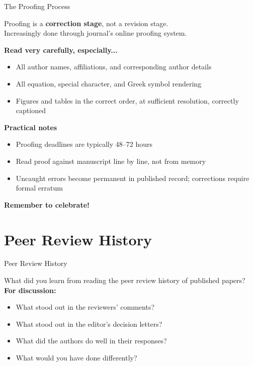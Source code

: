 \documentclass{beamer}
\begin{document}
\begin{frame}{The Proofing Process}

  \footnotesize
  \medskip
  Proofing is a \textbf{correction stage}, not a revision stage.\\
  Increasingly done through journal's online proofing system.

  \medskip
  \textbf{Read very carefully, especially...}
  \begin{itemize}
    \item All author names, affiliations, and corresponding
      author details
    \item All equation, special character, and Greek symbol
      rendering
    \item Figures and tables in the correct order, at
      sufficient resolution, correctly captioned
  \end{itemize}

  \medskip
  \textbf{Practical notes}
  \begin{itemize}
    \item Proofing deadlines are typically 48--72 hours
    \item Read proof against manuscript line by line, not from memory
    \item Uncaught errors become permanent in published record; corrections require formal erratum
  \end{itemize}

  \begin{center}
  {\large \alert{\textbf{Remember to celebrate!}} }
  \end{center}

\end{frame}


\section{Peer Review History}

\begin{frame}{Peer Review History}

  
  What did you learn from reading the peer review history of published papers?\\

  \medskip
  \textbf{For discussion:}
  \begin{itemize}
    \item What stood out in the reviewers' comments?
    \item What stood out in the editor's decision letters?
    \item What did the authors do well in their responses?
    \item What would you have done differently?
  \end{itemize}


\end{frame}
\end{document}
